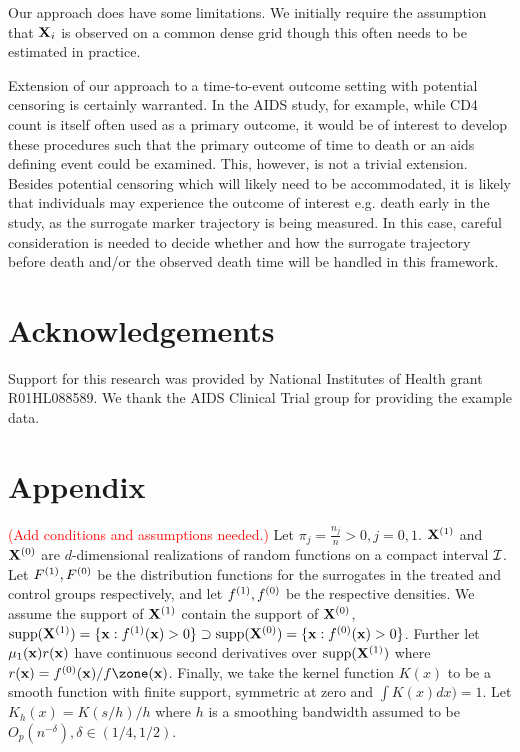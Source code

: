 \documentclass[useAMS,usenatbib,referee]{biom}
\def\Isc{{\cal I}}
\begin{document}
Our approach does have some limitations. We initially require the assumption that ${\bf X}_i$ is observed on a common dense grid though this often needs to be estimated in practice. 

Extension of our approach to a time-to-event outcome setting with potential censoring is certainly warranted. In the AIDS study, for example, while CD4 count is itself often used as a primary outcome, it would be of interest to develop these procedures such that the primary outcome of time to death or an aids defining event could be examined. This, however, is not a trivial extension. Besides potential censoring which will likely need to be accommodated, it is likely that individuals may experience the outcome of interest e.g. death early in the study, as the surrogate marker trajectory is being measured. In this case, careful consideration is needed to decide whether and how the surrogate trajectory before death and/or the observed death time will be handled in this framework.

\section*{Acknowledgements}
Support for this research was provided by National Institutes of Health grant R01HL088589. We thank the AIDS Clinical Trial group for providing the example data. 

\clearpage



\section{Appendix}
\textcolor{red}{(Add conditions and assumptions needed.)}
Let $\pi_j = \frac{n_j}{n} > 0, j = 0,1$. ${\bf X}^{(1)}$ and ${\bf X}^{(0)}$ are $d$-dimensional realizations of random functions on a compact interval $\Isc$. Let $F^{(1)}, F^{(0)}$ be the distribution functions for the surrogates in the treated and control groups respectively, and let $f^{(1)}, f^{(0)}$ be the respective densities. We assume the support of ${\bf X}^{(1)}$ contain the support of ${\bf X}^{(0)}$, $\text{supp}({\bf X}^{(1)}) = \{{\bf x} : f^{(1)}({\bf x}) > 0\} \supset \text{supp}({\bf X}^{(0)}) = \{{\bf x} : f^{(0)}({\bf x}) > 0\}$. Further {\color{red} let $\mu_1({\bf x})r({\bf x})$ have continuous second derivatives over $\text{supp}({\bf X}^{(1)})$} where $r(\bx) = f\szero(\bx)/f\zone(\bx)$. Finally, we take the kernel function $K(x)$ to be a smooth function with finite support, symmetric at zero and $\int K(x)dx) = 1$. Let $K_h(x) = K(s/h)/h$ where $h$ is a smoothing bandwidth assumed to be $O_p(n^{-\delta}), \delta \in (1/4, 1/2)$. 
\end{document}
